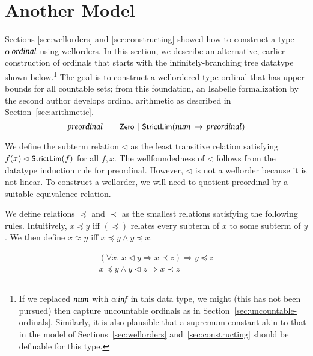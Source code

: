 \documentclass[11pt]{llncs}
\renewcommand{\HOLConst}[1]{{\textsf{\upshape\small #1}}}
\renewcommand{\HOLTyOp}[1]{\mbox{\fontencoding{T1}\fontfamily{bch}\fontseries{m}\fontshape{it}\fontsize{9.5}{10}\selectfont #1}}
\renewcommand{\HOLinline}[1]{\ensuremath{#1}}
\renewcommand{\HOLKeyword}[1]{\texttt{#1}}
\begin{document}
\section{Another Model}

Sections \ref{sec:wellorders} and \ref{sec:constructing} showed how to construct a type \HOLinline{\ensuremath{\alpha}\,\HOLTyOp{ordinal}} using wellorders.
In this section, we describe an alternative, earlier construction of ordinals that starts with the infinitely-branching tree datatype shown below.\footnote{If we replaced \HOLinline{\HOLTyOp{num}} with \HOLinline{\ensuremath{\alpha}\,\HOLTyOp{inf}} in this data type, we might (this has not been pursued) then capture uncountable ordinals as in Section~\ref{sec:uncountable-ordinals}.
Similarly, it is also plausible that a supremum constant akin to that in the model of Sections~\ref{sec:wellorders} and~\ref{sec:constructing} should be definable for this type.
}
The goal is to construct a wellordered type \HOLTyOp{ordinal} that has upper bounds for all countable sets; from this foundation, an Isabelle formalization by the second author \cite{Huffman-AFP05} develops ordinal arithmetic as described in Section~\ref{sec:arithmetic}.
\[
\HOLTyOp{preordinal}\,\,=\,\,\HOLConst{Zero}\,\,|\,\,\HOLConst{StrictLim}(\HOLTyOp{num}\,\ensuremath{\rightarrow}\,\HOLTyOp{preordinal})\]


We define the subterm relation $\lhd$ as the least transitive relation satisfying $f(x) \lhd \HOLConst{StrictLim}(f)$ for all $f, x$. The wellfoundedness of $\lhd$ follows from the datatype induction rule for \HOLTyOp{preordinal}. However, $\lhd$ is not a wellorder because it is not linear. To construct a wellorder, we will need to quotient \HOLTyOp{preordinal} by a suitable equivalence relation.

We define relations $\preceq$ and $\prec$ as the smallest relations satisfying the following rules. Intuitively, $x \preceq y$ iff $(\preceq)$ relates every subterm of $x$ to some subterm of $y$. We then define $x \approx y$ iff $x \preceq y \land y \preceq x$.

\[
\begin{array}{c}
(\forall x.\;x \lhd y \Rightarrow x \prec z) \Rightarrow y \preceq z\\[2mm]
x \preceq y \land y \lhd z \Rightarrow x \prec z
\end{array}
\]
\end{document}
